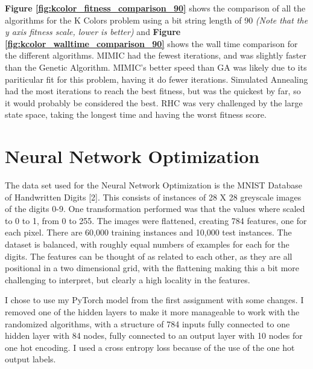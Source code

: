 \documentclass[letterpaper]{article} %
\begin{document}
\textbf{Figure \ref{fig:kcolor_fitness_comparison_90}} shows the comparison of all the algorithms for the K Colors problem using a bit string length of 90 \emph{(Note that the y axis fitness scale, lower is better)} and \textbf{Figure \ref{fig:kcolor_walltime_comparison_90}} shows the wall time comparison for the different algorithms.  MIMIC had the fewest iterations, and was slightly faster than the Genetic Algorithm.  MIMIC's better speed than GA was likely due to its pariticular fit for this problem, having it do fewer iterations.  Simulated Annealing had the most iterations to reach the best fitness, but was the quickest by far, so it would probably be considered the best.  RHC was very challenged by the large state space, taking the longest time and having the worst fitness score.

\section{Neural Network Optimization}

The data set used for the Neural Network Optimization is the MNIST Database of Handwritten Digits [2].  This consists of instances of 28 X 28 greyscale images of the digits 0-9.  One transformation performed was that the values where scaled to 0 to 1, from 0 to 255.  The images were flattened, creating 784 features, one for each pixel.  There are 60,000 training instances and 10,000 test instances.  The dataset is balanced, with roughly equal numbers of examples for each for the digits.  The features can be thought of as related to each other, as they are all positional in a two dimensional grid, with the flattening making this a bit more challenging to interpret, but clearly a high locality in the features.  

I chose to use my PyTorch model from the first assignment with some changes.  I removed one of the hidden layers to make it more manageable to work with the randomized algorithms, with a structure of 784 inputs fully connected to one hidden layer with 84 nodes, fully connected to an output layer with 10 nodes for one hot encoding.  I used a cross entropy loss because of the use of the one hot output labels.
\end{document}

